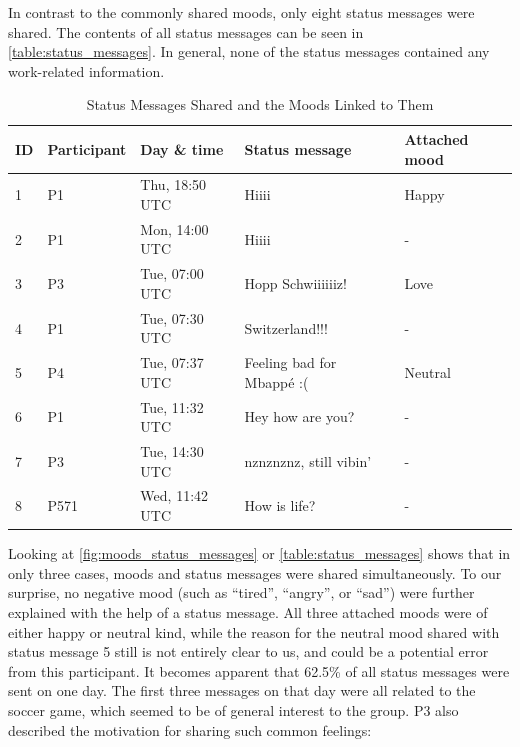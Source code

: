 
In contrast to the commonly shared moods, only eight status messages were shared. The contents of all status messages can be seen in \autoref{table:status_messages}. In general, none of the status messages contained any work-related information.

\begin{table}[h] \footnotesize
    \centering
    \begin{tabularx}{.8\textwidth}{l l l l l}
        \toprule
        ID & Participant & Day \& time    & Status message            & Attached mood \\
        \midrule
        1  & P1          & Thu, 18:50 UTC & Hiiii                     & Happy         \\
        2  & P1          & Mon, 14:00 UTC & Hiiii                     & -             \\
        3  & P3          & Tue, 07:00 UTC & Hopp Schwiiiiiiz!         & Love          \\
        4  & P1          & Tue, 07:30 UTC & Switzerland!!!            & -             \\
        5  & P4          & Tue, 07:37 UTC & Feeling bad for Mbappé :( & Neutral       \\
        6  & P1          & Tue, 11:32 UTC & Hey how are you?          & -             \\
        7  & P3          & Tue, 14:30 UTC & nznznznz, still vibin'    & -             \\
        8  & P571        & Wed, 11:42 UTC & How is life?              & -             \\
        \bottomrule
    \end{tabularx}
    \caption{Status Messages Shared and the Moods Linked to Them}
    \label{table:status_messages}
\end{table}

Looking at \autoref{fig:moods_status_messages} or \autoref{table:status_messages} shows that in only three cases, moods and status messages were shared simultaneously. To our surprise, no negative mood (such as \enquote{tired}, \enquote{angry}, or \enquote{sad}) were further explained with the help of a status message. All three attached moods were of either happy or neutral kind, while the reason for the neutral mood shared with status message 5 still is not entirely clear to us, and could be a potential error from this participant. It becomes apparent that 62.5\% of all status messages were sent on one day. The first three messages on that day were all related to the soccer game, which seemed to be of general interest to the group. P3 also described the motivation for sharing such common feelings:


